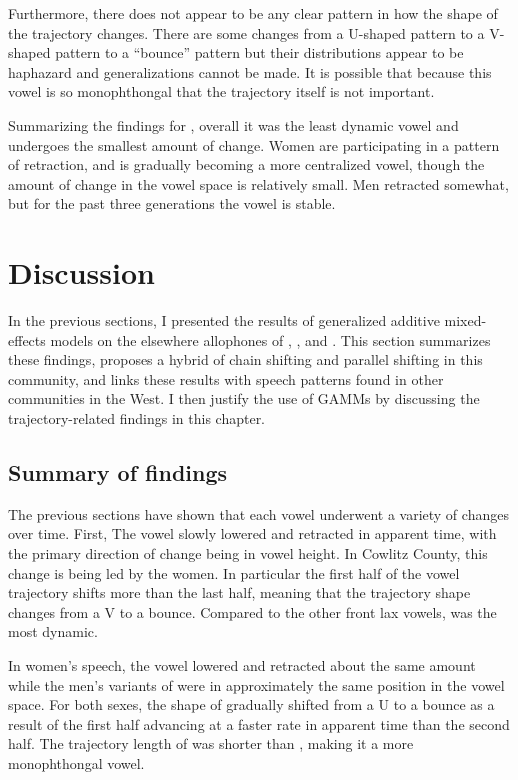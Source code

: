 Furthermore, there does not appear to be any clear pattern in how the shape of the trajectory changes. There are some changes from a U-shaped pattern to a V-shaped pattern to a ``bounce'' pattern but their distributions appear to be haphazard and generalizations cannot be made. It is possible that because this vowel is so monophthongal that the trajectory itself is not important.

Summarizing the findings for \bit, overall it was the least dynamic vowel and undergoes the smallest amount of change. Women are participating in a pattern of retraction, and \bit is gradually becoming a more centralized vowel, though the amount of change in the vowel space is relatively small. Men retracted somewhat, but for the past three generations the vowel is stable.

\section{Discussion}
\label{sec:preobstruent_discussion}

In the previous sections, I presented the results of generalized additive mixed-effects models on the elsewhere allophones of \trap, \dress, and \kit. This section summarizes these findings, proposes a hybrid of chain shifting and parallel shifting in this community, and links these results with speech patterns found in other communities in the West. I then justify the use of GAMMs by discussing the trajectory-related findings in this chapter.

\subsection{Summary of findings}
\label{bat_bet_bit_summary}

The previous sections have shown that each vowel underwent a variety of changes over time. First, The \bat vowel slowly lowered and retracted in apparent time, with the primary direction of change being in vowel height. In Cowlitz County, this change is being led by the women. In particular the first half of the vowel trajectory shifts more than the last half, meaning that the trajectory shape changes from a V to a bounce. Compared to the other front lax vowels, \bat was the most dynamic.

In women's speech, the \bet vowel lowered and retracted about the same amount while the men's variants of \bet were in approximately the same position in the vowel space. For both sexes, the shape of \bet gradually shifted from a U to a bounce as a result of the first half advancing at a faster rate in apparent time than the second half. The trajectory length of \bet was shorter than \bat, making it a more monophthongal vowel.

